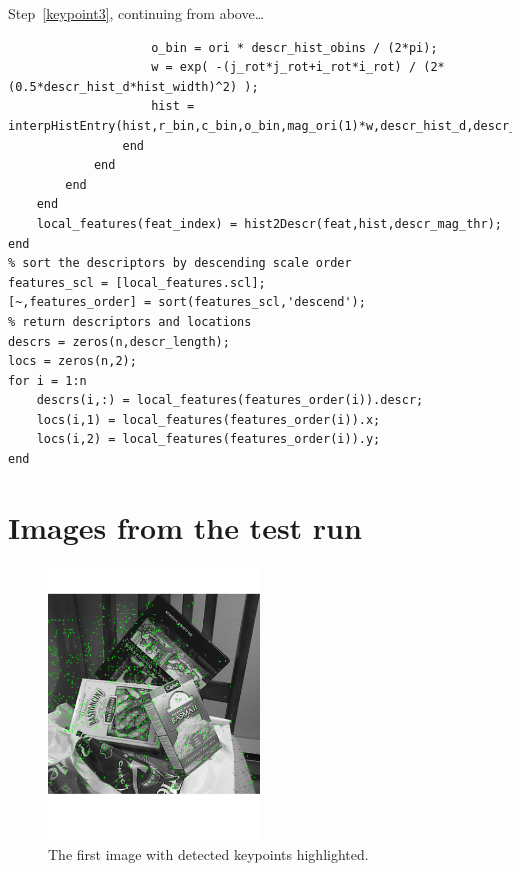 Step~\ref{keypoint3}, continuing from above\dots
\begin{lstlisting}
                    o_bin = ori * descr_hist_obins / (2*pi);
                    w = exp( -(j_rot*j_rot+i_rot*i_rot) / (2*(0.5*descr_hist_d*hist_width)^2) );
                    hist = interpHistEntry(hist,r_bin,c_bin,o_bin,mag_ori(1)*w,descr_hist_d,descr_hist_obins);
                end
            end
        end
    end
    local_features(feat_index) = hist2Descr(feat,hist,descr_mag_thr);
end
% sort the descriptors by descending scale order
features_scl = [local_features.scl];
[~,features_order] = sort(features_scl,'descend');
% return descriptors and locations
descrs = zeros(n,descr_length);
locs = zeros(n,2);
for i = 1:n
    descrs(i,:) = local_features(features_order(i)).descr;
    locs(i,1) = local_features(features_order(i)).x;
    locs(i,2) = local_features(features_order(i)).y;
end
\end{lstlisting}


\section{Images from the test run}

\begin{figure}[H]
  \includegraphics[width=0.5\textwidth]{img1}
  \caption{The first image with detected keypoints highlighted.}
\end{figure}


